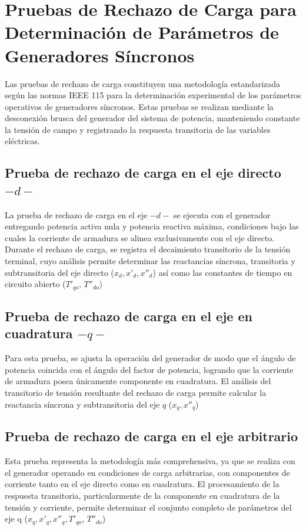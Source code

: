 \documentclass[conference]{IEEEtran}
\begin{document}
\section{Pruebas de Rechazo de Carga para Determinación de Parámetros de Generadores Síncronos} 

Las pruebas de rechazo de carga constituyen una metodología estandarizada según las normas IEEE 115
para la determinación experimental de los parámetros operativos de generadores síncronos. Estas pruebas
se realizan mediante la desconexión brusca del generador del sistema de potencia, manteniendo constante
la tensión de campo y registrando la respuesta transitoria de las variables eléctricas.

\subsection{Prueba de rechazo de carga en el eje directo $-d-$}

La prueba de rechazo de carga en el eje $-d-$ se ejecuta con el generador entregando potencia activa nula y potencia reactiva máxima,
condiciones bajo las cuales la corriente de armadura se alinea exclusivamente con el eje directo.
Durante el rechazo de carga, se registra el decaimiento transitorio de la tensión terminal, cuyo análisis
permite determinar las reactancias síncrona, transitoria y subtransitoria del eje directo ($x_d, x'_d, x''_d$) así como las constantes
de tiempo en circuito abierto ($T'_{qo}$, $T''_{do}$)

\subsection{Prueba de rechazo de carga en el eje en cuadratura $-q-$}

Para esta prueba, se ajusta la operación del generador de modo que el ángulo de potencia coincida con el ángulo del factor de potencia,
logrando que la corriente de armadura posea únicamente componente en cuadratura. El análisis del transitorio de tensión resultante del
rechazo de carga permite calcular la reactancia síncrona y subtransitoria del eje $q$ ($x_q, x''_q$)

\subsection{Prueba de rechazo de carga en el eje arbitrario}

Esta prueba representa la metodología más comprehensiva, ya que se realiza con el generador operando en condiciones de carga arbitrarias,
con componentes de corriente tanto en el eje directo como en cuadratura. El procesamiento de la respuesta transitoria, particularmente de
la componente en cuadratura de la tensión y corriente, permite determinar el conjunto completo de parámetros del eje q 
($x_q, x'_q, x''_q, T'_{qo}$, $T''_{do}$)
\end{document}
